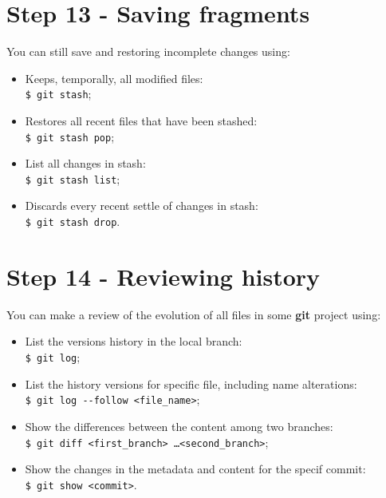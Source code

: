 \documentclass[12pt,a4paper,titlepage,brazil]{article}
\begin{document}
{\section{Step 13 - Saving fragments}

You can still save and restoring incomplete changes using:

\begin{itemize}
 \item Keeps, temporally, all modified files:\\
   \texttt{\$ git stash};
 \item Restores all recent files that have been stashed:\\
   \texttt{\$ git stash pop};
 \item List all changes in stash:\\
   \texttt{\$ git stash list};
 \item Discards every recent settle of changes in stash:\\
   \texttt{\$ git stash drop}.
\end{itemize}  


\section{Step 14 - Reviewing history}

You can make a review of the evolution of all files in some {\bf git} project using:

\begin{itemize}
 \item List the versions history in the local branch:\\
   \texttt{\$ git log};
 \item List the history versions for specific file, including name alterations:\\
   \texttt{\$ git log -\hspace{0.01cm}-follow <file\_name>};
 \item Show the differences between the content among two branches:\\
   \texttt{\$ git diff <first\_branch> \dots <second\_branch>};
 \item Show the changes in the metadata and content for the specif commit:\\
   \texttt{\$ git show <commit>}.
\end{itemize}  



}
\end{document}
